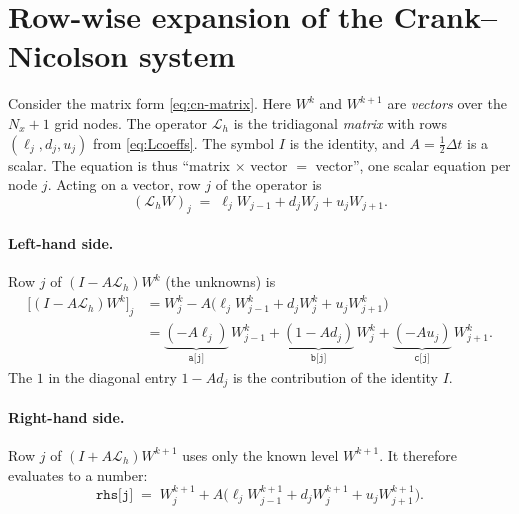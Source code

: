 \documentclass[11pt]{article}
\newcommand{\Lh}{\mathcal{L}_h}
\begin{document}
\appendix
\section{Row-wise expansion of the Crank--Nicolson system}\label{app:cn}
Consider the matrix form \eqref{eq:cn-matrix}. Here $W^{k}$ and $W^{k+1}$ are \emph{vectors} over
the $N_x{+}1$ grid nodes. The operator $\Lh$ is the tridiagonal \emph{matrix} with rows
$(\ell_j,d_j,u_j)$ from \eqref{eq:Lcoeffs}. The symbol $I$ is the identity, and $A=\tfrac12\Delta t$
is a scalar. The equation is thus ``matrix $\times$ vector $=$ vector'', one scalar equation per
node $j$. Acting on a vector, row $j$ of the operator is
\begin{equation}
  (\Lh W)_j \;=\; \ell_j W_{j-1} + d_j W_j + u_j W_{j+1}.
\end{equation}

\paragraph{Left-hand side.} Row $j$ of $(I-A\Lh)W^{k}$ (the unknowns) is
\begin{align}
  \bigl[(I-A\Lh)W^{k}\bigr]_j
   &= W_j^{k} - A\bigl(\ell_j W_{j-1}^{k}+d_j W_j^{k}+u_j W_{j+1}^{k}\bigr)\nonumber\\
   &= \underbrace{(-A\ell_j)}_{\texttt{a[j]}}\,W_{j-1}^{k}
    + \underbrace{(1-Ad_j)}_{\texttt{b[j]}}\,W_{j}^{k}
    + \underbrace{(-Au_j)}_{\texttt{c[j]}}\,W_{j+1}^{k}.
\end{align}
The $1$ in the diagonal entry $1-Ad_j$ is the contribution of the identity $I$.

\paragraph{Right-hand side.} Row $j$ of $(I+A\Lh)W^{k+1}$ uses only the known level $W^{k+1}$. It
therefore evaluates to a number:
\begin{equation}
  \texttt{rhs[j]} \;=\; W_j^{k+1} + A\bigl(\ell_j W_{j-1}^{k+1}+d_j W_j^{k+1}+u_j W_{j+1}^{k+1}\bigr).
\end{equation}
\end{document}
